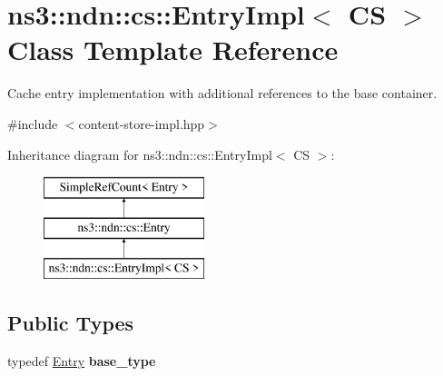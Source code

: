 \hypertarget{classns3_1_1ndn_1_1cs_1_1EntryImpl}{}\section{ns3\+:\+:ndn\+:\+:cs\+:\+:Entry\+Impl$<$ CS $>$ Class Template Reference}
\label{classns3_1_1ndn_1_1cs_1_1EntryImpl}


Cache entry implementation with additional references to the base container.  




{\ttfamily \#include $<$content-\/store-\/impl.\+hpp$>$}

Inheritance diagram for ns3\+:\+:ndn\+:\+:cs\+:\+:Entry\+Impl$<$ CS $>$\+:\begin{figure}[H]
\begin{center}
\leavevmode
\includegraphics[height=3.000000cm]{classns3_1_1ndn_1_1cs_1_1EntryImpl}
\end{center}
\end{figure}
\subsection*{Public Types}
\begin{DoxyCompactItemize}
\item 
typedef \hyperlink{classns3_1_1ndn_1_1cs_1_1Entry}{Entry} {\bfseries base\+\_\+type}\hypertarget{classns3_1_1ndn_1_1cs_1_1EntryImpl_ac4871404f8c08969e235dc042714ae41}{}\label{classns3_1_1ndn_1_1cs_1_1EntryImpl_ac4871404f8c08969e235dc042714ae41}

\end{DoxyCompactItemize}
